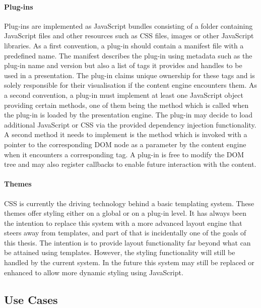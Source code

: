      \paragraph{Plug-ins} Plug-ins are implemented as JavaScript bundles
      consisting of a folder containing JavaScript files and other resources
      such as CSS files, images or other JavaScript libraries. As a first
      convention, a plug-in should contain a manifest file with a predefined
      name. The manifest describes the plug-in using metadata such as the
      plug-in name and version but also a list of tags it provides and handles
      to be used in a presentation. The plug-in claims unique ownership for
      these tags and is solely responsible for their visualisation if the
      content engine encounters them. As a second convention, a plug-in must
      implement at least one JavaScript object providing certain methods, one
      of them being the  method which is called when the plug-in
      is loaded by the presentation engine. The plug-in may decide to load
      additional JavaScript or CSS via the provided dependency injection
      functionality. A second method it needs to implement is the
       method which is invoked with a pointer to the
      corresponding DOM node as a parameter by the content engine when it
      encounters a corresponding tag. A plug-in is free to modify the DOM tree
      and may also register callbacks to enable future interaction with the
      content.

     \paragraph{Themes} CSS is currently the driving technology behind a basic
      templating system. These themes offer styling either on a global or on a
      plug-in level. It has always been the intention to replace this system
      with a more advanced layout engine that steers away from templates, and
      part of that is incidentally one of the goals of this thesis. The
      intention is to provide layout functionality far beyond what can be
      attained using templates. However, the styling functionality will still
      be handled by the current system. In the future this system may still be
      replaced or enhanced to allow more dynamic styling using JavaScript.

   \subsection{Use Cases}

